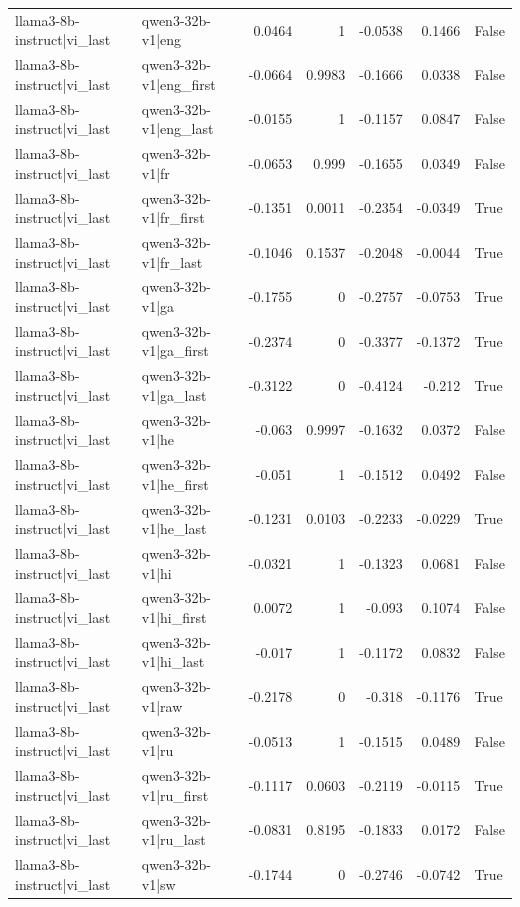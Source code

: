 \begin{table}
\begin{tabular}{l l r r r r l}
llama3-8b-instruct|vi_last & qwen3-32b-v1|eng & 0.0464 & 1 & -0.0538 & 0.1466 & False \\
llama3-8b-instruct|vi_last & qwen3-32b-v1|eng_first & -0.0664 & 0.9983 & -0.1666 & 0.0338 & False \\
llama3-8b-instruct|vi_last & qwen3-32b-v1|eng_last & -0.0155 & 1 & -0.1157 & 0.0847 & False \\
llama3-8b-instruct|vi_last & qwen3-32b-v1|fr & -0.0653 & 0.999 & -0.1655 & 0.0349 & False \\
llama3-8b-instruct|vi_last & qwen3-32b-v1|fr_first & -0.1351 & 0.0011 & -0.2354 & -0.0349 & True \\
llama3-8b-instruct|vi_last & qwen3-32b-v1|fr_last & -0.1046 & 0.1537 & -0.2048 & -0.0044 & True \\
llama3-8b-instruct|vi_last & qwen3-32b-v1|ga & -0.1755 & 0 & -0.2757 & -0.0753 & True \\
llama3-8b-instruct|vi_last & qwen3-32b-v1|ga_first & -0.2374 & 0 & -0.3377 & -0.1372 & True \\
llama3-8b-instruct|vi_last & qwen3-32b-v1|ga_last & -0.3122 & 0 & -0.4124 & -0.212 & True \\
llama3-8b-instruct|vi_last & qwen3-32b-v1|he & -0.063 & 0.9997 & -0.1632 & 0.0372 & False \\
llama3-8b-instruct|vi_last & qwen3-32b-v1|he_first & -0.051 & 1 & -0.1512 & 0.0492 & False \\
llama3-8b-instruct|vi_last & qwen3-32b-v1|he_last & -0.1231 & 0.0103 & -0.2233 & -0.0229 & True \\
llama3-8b-instruct|vi_last & qwen3-32b-v1|hi & -0.0321 & 1 & -0.1323 & 0.0681 & False \\
llama3-8b-instruct|vi_last & qwen3-32b-v1|hi_first & 0.0072 & 1 & -0.093 & 0.1074 & False \\
llama3-8b-instruct|vi_last & qwen3-32b-v1|hi_last & -0.017 & 1 & -0.1172 & 0.0832 & False \\
llama3-8b-instruct|vi_last & qwen3-32b-v1|raw & -0.2178 & 0 & -0.318 & -0.1176 & True \\
llama3-8b-instruct|vi_last & qwen3-32b-v1|ru & -0.0513 & 1 & -0.1515 & 0.0489 & False \\
llama3-8b-instruct|vi_last & qwen3-32b-v1|ru_first & -0.1117 & 0.0603 & -0.2119 & -0.0115 & True \\
llama3-8b-instruct|vi_last & qwen3-32b-v1|ru_last & -0.0831 & 0.8195 & -0.1833 & 0.0172 & False \\
llama3-8b-instruct|vi_last & qwen3-32b-v1|sw & -0.1744 & 0 & -0.2746 & -0.0742 & True \\

\end{tabular}
\end{table}
